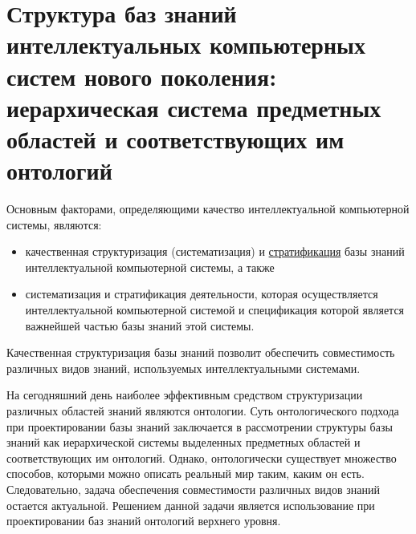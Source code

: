 \chapter{Структура баз знаний интеллектуальных компьютерных систем нового поколения: иерархическая система предметных областей и соответствующих им онтологий}
\label{chapter_kb}


Основным факторами, определяющими качество интеллектуальной компьютерной системы, являются:
	\begin{itemize}
		\item {качественная структуризация (систематизация) и \uline{стратификация} базы знаний интеллектуальной 		компьютерной системы, а также}
		\item {систематизация и стратификация деятельности, которая осуществляется интеллектуальной компьютерной системой и спецификация которой является важнейшей частью базы знаний этой системы.}
	\end{itemize}

Качественная структуризация базы знаний позволит обеспечить совместимость различных видов знаний, используемых интеллектуальными системами.  

На сегодняшний день наиболее эффективным средством структуризации различных областей знаний являются онтологии. Суть онтологического подхода при проектировании базы знаний заключается в рассмотрении структуры базы знаний как иерархической системы выделенных предметных областей и соответствующих им онтологий. Однако, онтологически существует множество способов, которыми можно описать реальный мир таким, каким он есть. Следовательно, задача обеспечения совместимости различных видов знаний остается актуальной. Решением данной задачи является использование при проектировании баз знаний онтологий верхнего уровня.

\begin{SCn}
\end{SCn}

